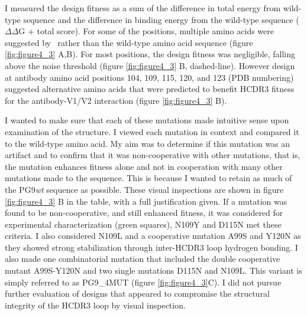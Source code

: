 I measured the design fitness as a sum of the difference in total energy from wild-type sequence and the difference in binding energy from the wild-type sequence ($\Delta\Delta$G + total score). For some of the positions, multiple amino acids were suggested by \rosetta~rather than the wild-type amino acid sequence (figure \ref{fig:figure4_3} A,B). For most positions, the design fitness was negligible, falling above the noise threshold (figure \ref{fig:figure4_3} B, dashed-line). However design at antibody amino acid positions 104, 109, 115, 120, and 123 (PDB numbering) suggested alternative amino acids that were predicted to benefit HCDR3 fitness for the antibody-V1/V2 interaction (figure \ref{fig:figure4_3} B).

I wanted to make sure that each of these mutations made intuitive sense upon examination of the structure. I viewed each mutation in context and compared it to the wild-type amino acid. My aim was to determine if this mutation was an artifact and to confirm that it was non-cooperative with other mutations, that is, the mutation enhances fitness alone and not in cooperation with many other mutations made to the sequence. This is because I wanted to retain as much of the PG9\textit{wt} sequence as possible. These visual inspections are shown in figure \ref{fig:figure4_3} B in the table, with a full justification given. If a mutation was found to be non-cooperative, and still enhanced fitness, it was considered for experimental characterization (green squares), N109Y and D115N met these criteria. I also considered N109L and a cooperative mutation A99S and Y120N as they showed strong stabilization through inter-HCDR3 loop hydrogen bonding. I also made one combinatorial mutation that included the double cooperative mutant A99S-Y120N and two single mutations D115N and N109L. This variant is simply referred to as PG9\_4MUT (figure \ref{fig:figure4_3}C). I did not pursue further evaluation of designs that appeared to compromise the structural integrity of the HCDR3 loop by visual inspection.

